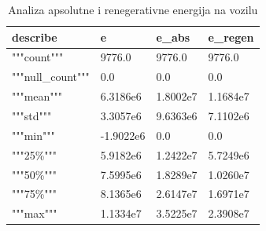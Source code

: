 \begin{table}[!ht]
    \centering
    \caption{Analiza apsolutne i renegerativne energija na vozilu}
    \begin{tabular}{llll}
    \hline
        \textbf{describe} & \textbf{e} & \textbf{e\_abs} & \textbf{e\_regen} \\ \hline
        """count""" & 9776.0 & 9776.0 & 9776.0 \\ 
        """null\_count""" & 0.0 & 0.0 & 0.0 \\ 
        """mean""" & 6.3186e6 & 1.8002e7 & 1.1684e7 \\ 
        """std""" & 3.3057e6 & 9.6363e6 & 7.1102e6 \\ 
        """min""" & -1.9022e6 & 0.0 & 0.0 \\ 
        """25\%""" & 5.9182e6 & 1.2422e7 & 5.7249e6 \\ 
        """50\%""" & 7.5995e6 & 1.8289e7 & 1.0260e7 \\ 
        """75\%""" & 8.1365e6 & 2.6147e7 & 1.6971e7 \\ 
        """max""" & 1.1334e7 & 3.5225e7 & 2.3908e7 \\ \hline
    \end{tabular}
    \label{table:c:energies2}
\end{table}
